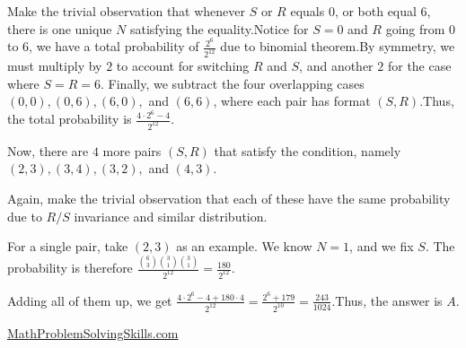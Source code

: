 \begin{enumerate}
 Make the trivial observation that whenever $S$ or $R$ equals $0$, or both equal $6$, there is one unique $N$ satisfying the equality.Notice for $S = 0$ and $R$ going from $0$ to $6$, we have a total probability of $\frac{2^6}{2^{12}}$ due to binomial theorem.By symmetry, we must multiply by $2$ to account for switching $R$ and $S$, and another $2$ for the case where $S=R=6$. Finally, we subtract the four overlapping cases $(0, 0), (0, 6), (6,0),$ and $(6, 6)$, where each pair has format $(S, R)$.Thus, the total probability is $\frac{4 \cdot 2^6 - 4}{2^{12}}$.

 Now, there are $4$ more pairs $(S,R)$ that satisfy the condition, namely $(2, 3), (3, 4), (3, 2),$ and $(4, 3)$.

 Again, make the trivial observation that each of these have the same probability due to $R/S$ invariance and similar distribution. 

 For a single pair, take $(2, 3)$ as an example. We know $N=1$, and we fix $S$. The probability is therefore $\frac{\binom{6}{3} \binom{3}{1} \binom{3}{1}}{2^{12}} = \frac{180}{2^{12}}$.

 Adding all of them up, we get $\frac{4 \cdot 2^6 - 4 + 180 \cdot 4}{2^{12}} = \frac{2^6+179}{2^{10}} = \frac{243}{1024}$.Thus, the answer is $\boxed{A}$.

 


 


 \href{https://mathproblemsolvingskills.wordpress.com/}{MathProblemSolvingSkills.com}

 


\end{enumerate}